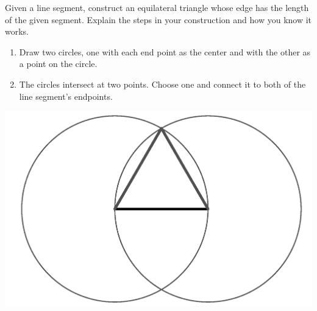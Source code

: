 \documentclass[nooutcomes]{ximera}
\begin{document}
%



\begin{problem}
Given a line segment, construct an equilateral triangle whose edge has the length of the given segment. Explain the steps in your construction and how you know it works.
\begin{freeResponse}
\begin{hint}%
\begin{enumerate} 
\item Draw two circles, one with each end point as the center and with the other as a point on the circle. 
\item The circles intersect at two points.  Choose one and 
connect it to both of the line segment's endpoints.
\end{enumerate}
\begin{image}
\includegraphics{eqtri.png}
\end{image}
\end{hint}
\end{freeResponse}
\end{problem}
\end{document}
